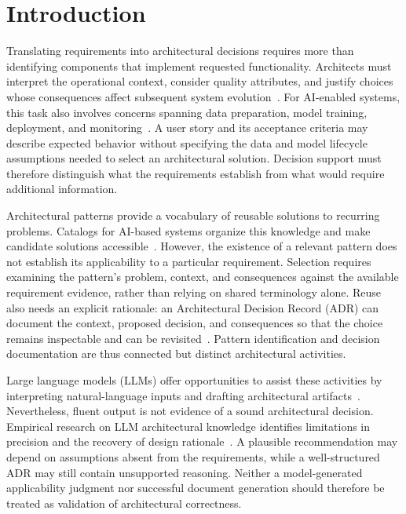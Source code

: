\section{Introduction}
\label{sec:introduction}

Translating requirements into architectural decisions requires more than
identifying components that implement requested functionality. Architects must
interpret the operational context, consider quality attributes, and justify
choices whose consequences affect subsequent system evolution~\cite{jansen2005decisions,kruchten2006architectural}.
For AI-enabled systems, this task also involves concerns spanning data
preparation, model training, deployment, and monitoring~\cite{washizaki2019patterns,heiland2023patterns}.
A user story and its acceptance criteria may describe expected behavior without
specifying the data and model lifecycle assumptions needed to select an
architectural solution. Decision support must therefore distinguish what the
requirements establish from what would require additional information.

Architectural patterns provide a vocabulary of reusable solutions to recurring
problems. Catalogs for AI-based systems organize this knowledge and make
candidate solutions accessible~\cite{heiland2023patterns,aiPatternsRepository}.
However, the existence of a relevant pattern does not establish its applicability
to a particular requirement. Selection requires examining the pattern's problem,
context, and consequences against the available requirement evidence, rather
than relying on shared terminology alone. Reuse also needs an explicit rationale:
an Architectural Decision Record (ADR) can document the context, proposed
decision, and consequences so that the choice remains inspectable and can be
revisited~\cite{nygard2011adr}. Pattern identification and decision documentation
are thus connected but distinct architectural activities.

Large language models (LLMs) offer opportunities to assist these activities by
interpreting natural-language inputs and drafting architectural
artifacts~\cite{cervantes2026assistants,dhar2024generating}.
Nevertheless, fluent output is not evidence of a sound architectural decision.
Empirical research on LLM architectural knowledge identifies limitations in
precision and the recovery of design rationale~\cite{soliman2025architectural}.
A plausible recommendation may depend on assumptions absent from the
requirements, while a well-structured ADR may still contain unsupported
reasoning. Neither a model-generated applicability judgment nor successful
document generation should therefore be treated as validation of architectural
correctness.

